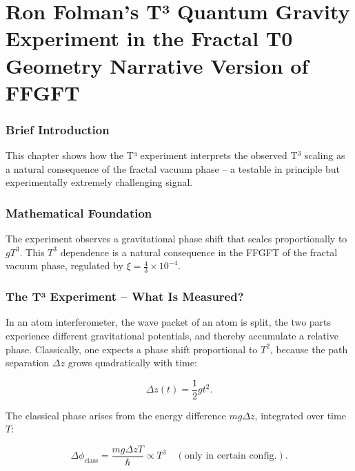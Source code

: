 \chapter{Ron Folman's T³ Quantum Gravity Experiment in the Fractal T0 Geometry  Narrative Version of FFGFT}


	
	\subsection*{Brief Introduction}
	
	This chapter shows how the T³ experiment interprets the observed T$^3$ scaling as a natural consequence of the fractal vacuum phase -- a testable in principle but experimentally extremely challenging signal.
	
	\subsection*{Mathematical Foundation}
	
	The experiment observes a gravitational phase shift that scales proportionally to \(g T^3\). This \(T^3\) dependence is a natural consequence in the FFGFT of the fractal vacuum phase, regulated by \(\xi = \frac{4}{3} \times 10^{-4}\).
	

	
	\subsection*{The T³ Experiment – What Is Measured?}
	
	In an atom interferometer, the wave packet of an atom is split, the two parts experience different gravitational potentials, and thereby accumulate a relative phase. Classically, one expects a phase shift proportional to \(T^2\), because the path separation \(\Delta z\) grows quadratically with time:
	
	\begin{equation}
		\Delta z(t) = \frac{1}{2} g t^2.
	\end{equation}
	
	The classical phase arises from the energy difference \(m g \Delta z\), integrated over time \(T\):
	
	\begin{equation}
		\Delta \phi_{\text{class}} = \frac{m g \Delta z T}{\hbar} \propto T^3 \quad (\text{only in certain config.}).
	\end{equation}
	
